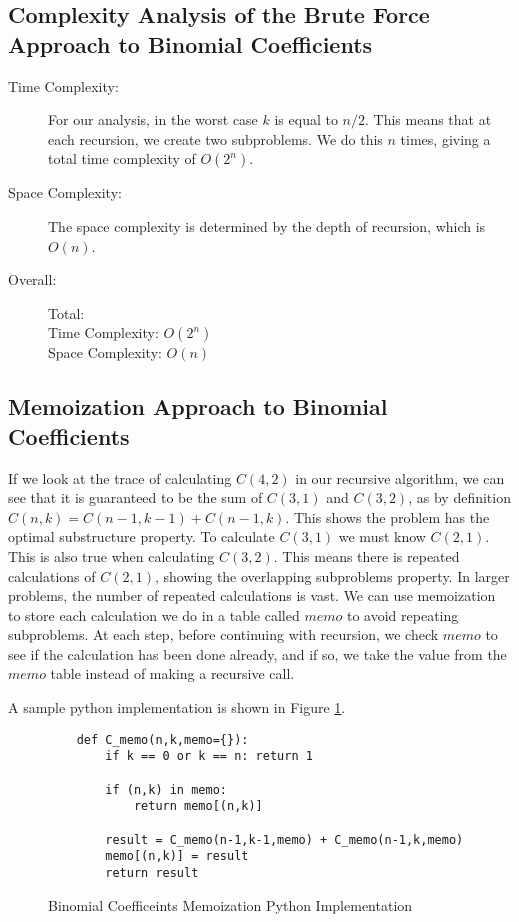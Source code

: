 \subsection{Complexity Analysis of the Brute Force Approach to Binomial Coefficients}
\begin{description}
    \item[Time Complexity:]
        For our analysis, in the worst case $k$ is equal to $n/2$.
        This means that at each recursion,
        we create two subproblems.
        We do this $n$ times, giving a total time complexity of $O(2^n)$.

    \item[Space Complexity:] 
        The space complexity is determined by the depth of recursion, which is $O(n)$.

    \item[Overall:] Total:\\
        Time Complexity: $O(2^n)$\\
        Space Complexity: $O(n)$
    
\end{description}

\subsection{Memoization Approach to Binomial Coefficients}
If we look at the trace of calculating $C(4,2)$ in our recursive algorithm, we can see that it is guaranteed to be the sum of $C(3,1)$ and $C(3,2)$, as by definition $C(n,k) = C(n-1,k-1) + C(n-1, k)$.
This shows the problem has the optimal substructure property.
To calculate $C(3,1)$ we must know $C(2,1)$.
This is also true when calculating $C(3,2)$.
This means there is repeated calculations of $C(2,1)$,
showing the overlapping subproblems property.
In larger problems, the number of repeated calculations is vast.
We can use memoization to store each calculation we do in a table called $memo$ to avoid repeating subproblems.
At each step, before continuing with recursion, we check $memo$ to see if the calculation has been done already, and if so, we take the value from the $memo$ table instead of making a recursive call.

A sample python implementation is shown in Figure \ref{fig:binomial-memo}.

\begin{figure}[H]
    \centering
    \begin{lstlisting}
    def C_memo(n,k,memo={}):
        if k == 0 or k == n: return 1
    
        if (n,k) in memo:
            return memo[(n,k)]
        
        result = C_memo(n-1,k-1,memo) + C_memo(n-1,k,memo)
        memo[(n,k)] = result
        return result
    \end{lstlisting}
    \caption{Binomial Coefficeints Memoization Python Implementation}
    \label{fig:binomial-memo}
\end{figure}

